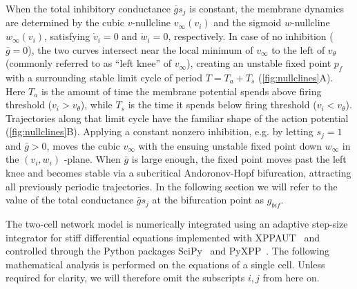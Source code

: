 When the total inhibitory conductance $\bar g s_{j}$ is constant, the membrane dynamics are determined by the cubic $v$-nullcline $v_{\infty}(v_i)$ and the sigmoid $w$-nullcline $w_{\infty}(v_{i})$, satisfying $\dot v_{i}=0$ and $\dot w_{i}=0$, respectively.
In case of no inhibition ($\bar g=0$), the two curves intersect near the local minimum of $v_{\infty}$ to the left of $v_{\theta}$ (commonly referred to as ``left knee'' of $v_{\infty}$), creating an unstable fixed point $p_{f}$ with a surrounding stable limit cycle of period $T=T_{a}+T_{s}$ (\cref{fig:nullclines}A).
Here $T_{a}$ is the amount of time the membrane potential spends above firing threshold ($v_{i}>v_\theta$), while $T_{s}$ is the time it spends below firing threshold ($v_{i}<v_\theta$). Trajectories along that limit cycle have the familiar shape of the action potential (\cref{fig:nullclines}B).
Applying a constant nonzero inhibition, e.g. by letting $s_{j}=1$ and $\bar g > 0$, moves the cubic $v_{\infty}$ with the ensuing unstable fixed point down $w_{\infty}$ in the $(v_{i}, w_{i})$ -plane.
When $\bar g$ is large enough, the fixed point moves past the left knee and becomes stable via a subcritical Andoronov-Hopf bifurcation, attracting all previously periodic trajectories.
In the following section we will refer to the value of the total conductance $\bar g s_{j}$ at the bifurcation point as $g_{bif}$.

The two-cell network model is numerically integrated using an adaptive step-size integrator for stiff differential equations implemented with XPPAUT~\citep{ermentrout2002} and controlled through the Python packages SciPy~\citep{scipy2020} and PyXPP~\citep{pyxpp}.
The following mathematical analysis is performed on the equations of a single cell.
Unless required for clarity, we will therefore omit the subscripts $i,j$ from here on.
